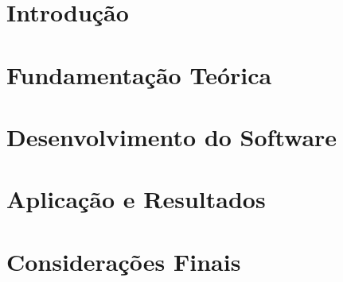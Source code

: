 \documentclass{./public/ufpatccdoisautores}
\begin{document}

\chapter{Introdução}


\chapter{Fundamentação Teórica}


\chapter{Desenvolvimento do Software}


\chapter{Aplicação e Resultados}


\chapter{Considerações Finais}


\renewcommand\bibname{Referências Bibliográficas}



\clearpage

\end{document}
